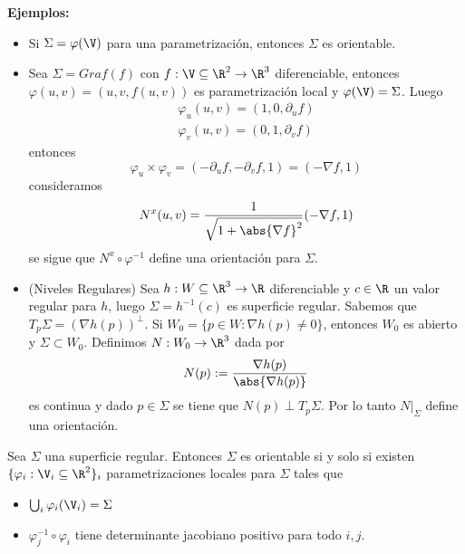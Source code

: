 \documentclass{article}
\begin{document}
\noindent\textbf{Ejemplos:}
\begin{itemize}
    \item Si $\Sigma=\varphi(\V)$ para una parametrización, entonces $\Sigma$ 
    es orientable.

    \item Sea $\Sigma=Graf(f)$ con $f:\V\subseteq\R^{2}\to\R^{3}$ diferenciable, entonces 
    $\varphi(u,v)=(u,v,f(u,v))$ es parametrización local y $\varphi(\V)=\Sigma$. Luego
    \begin{align*}
        \varphi_{u}(u,v)=(1,0,\partial_{u}f) \\
        \varphi_{v}(u,v)=(0,1,\partial_{v}f)
    \end{align*}
    entonces
    \begin{equation*}
        \varphi_{u}\times\varphi_{v}=(-\partial_{u}f,-\partial_{v}f,1)=(-\nabla f,1)
    \end{equation*}
    consideramos
    \begin{equation*}
        N^{x}(u,v)=\frac{1}{\sqrt{1+\abs{\nabla f}^{2}}}(-\nabla f,1)
    \end{equation*}
    se sigue que $N^{x}\circ\varphi^{-1}$ define una orientación para $\Sigma$.

    \item (Niveles Regulares) Sea $h:W\subseteq\R^{3}\to\R$ diferenciable y $c\in\R$ un valor 
    regular para $h$, luego $\Sigma=h^{-1}(c)$ es superficie regular. Sabemos que $T_{p}\Sigma=
    (\nabla h(p))^{\perp}$. Si $W_{0}=\{p\in W:\nabla h(p)\neq0\}$, entonces $W_{0}$ es abierto y
    $\Sigma\subset W_{0}$. Definimos $N:W_{0}\to\R^{3}$ dada por
    \begin{equation*}
        N(p):=\frac{\nabla h(p)}{\abs{\nabla h(p)}}
    \end{equation*}
    es continua y dado $p\in\Sigma$ se tiene que $N(p)\perp T_{p}\Sigma$. Por lo tanto 
    $N\big|_{\Sigma}$ define una orientación.
\end{itemize}

\begin{prop}
    Sea $\Sigma$ una superficie regular. Entonces $\Sigma$ es orientable si y solo si existen
    $\{\varphi_{i}:\V_{i}\subseteq\R^{2}\}_{i}$ parametrizaciones locales para $\Sigma$ tales que
    \begin{itemize}
        \item $\bigcup_{i}\varphi_{i}(\V_{i})=\Sigma$
        \item $\varphi_{j}^{-1}\circ\varphi_{i}$ tiene determinante jacobiano positivo para todo 
        $i,j$.
    \end{itemize}
\end{prop}
\end{document}
